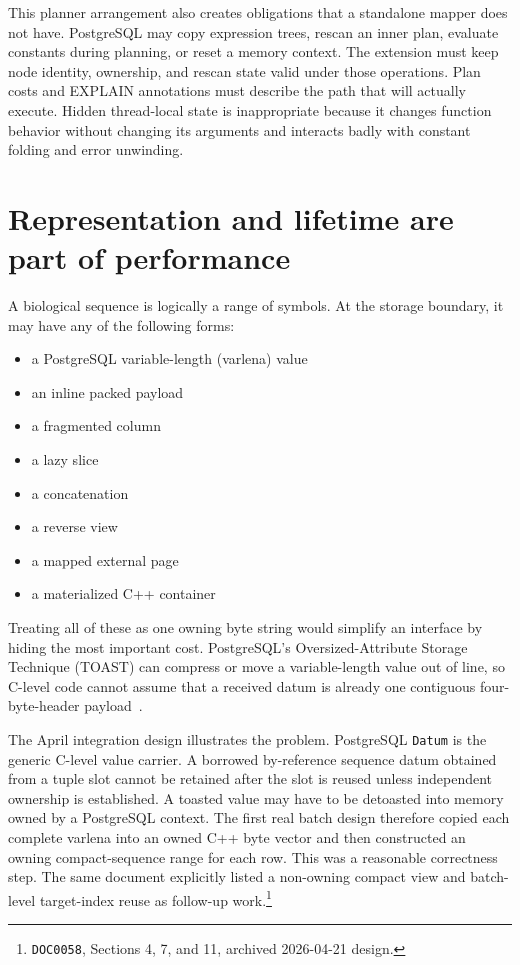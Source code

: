 This planner arrangement also creates obligations that a standalone
mapper does not have.  PostgreSQL may copy expression trees, rescan an
inner plan, evaluate constants during planning, or reset a memory context.
The extension must keep node identity, ownership, and rescan state valid
under those operations.  Plan costs and EXPLAIN annotations must describe
the path that will actually execute.  Hidden thread-local state is
inappropriate because it changes function behavior without changing its
arguments and interacts badly with constant folding and error unwinding.

\section{Representation and lifetime are part of performance}
\label{sec:representation-gap}

A biological sequence is logically a range of symbols.  At the storage
boundary, it may have any of the following forms:

\begin{itemize}
  \item a PostgreSQL variable-length (varlena) value
  \item an inline packed payload
  \item a fragmented column
  \item a lazy slice
  \item a concatenation
  \item a reverse view
  \item a mapped external page
  \item a materialized C++ container
\end{itemize}

Treating all of these as one owning byte string would simplify an interface by
hiding the most important cost.  PostgreSQL's Oversized-Attribute Storage Technique
(TOAST) can compress or move a variable-length value out of line, so C-level
code cannot assume that a received datum is already one contiguous
four-byte-header payload~\cite{postgresql17_toast}.

The April integration design illustrates the problem.  PostgreSQL
\texttt{Datum} is the generic C-level value carrier.  A borrowed
by-reference sequence datum obtained from a tuple slot cannot be retained
after the slot is reused unless independent ownership is established.  A
toasted value may have to be detoasted into memory owned by a PostgreSQL context.
The first real batch design therefore copied each complete varlena into an
owned C++ byte vector and then constructed an owning
compact-sequence range for each row.  This was a reasonable
correctness step.  The same document explicitly listed a non-owning
compact view and batch-level target-index reuse as follow-up
work.\footnote{\texttt{DOC0058}, Sections 4, 7, and 11, archived
2026-04-21 design.}

